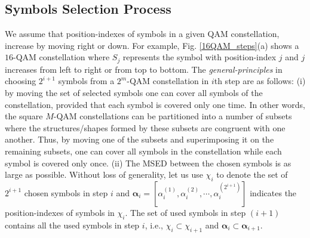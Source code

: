\documentclass[12pt, draftclsnofoot, onecolumn]{IEEEtran}
\newcommand{\mb}[1]{\boldsymbol{#1}}
\begin{document}
\subsection{Symbols Selection Process}
 We assume that position-indexes of symbols in a given QAM constellation,  increase by moving right or down.  For example, Fig. \ref{16QAM_steps}(a) shows   a $16$-QAM constellation   where $S_{j}$ represents the symbol with position-index $j$ and $j$ increases from left to right or  from top to bottom. 
  The \emph{general-principles} in choosing $2^{i+1}$ symbols from a $2^{m}$-QAM constellation in  $i$th step are as follows: (i) by moving the set  of  selected symbols one can  cover all symbols of the constellation, provided that each symbol is covered only one time.  In other words, the  square $M$-QAM constellations can be partitioned into a number of  subsets where the structures/shapes formed by these subsets are congruent with one another. Thus, by moving one of the subsets and superimposing it on the remaining subsets, one can cover all symbols in the constellation while each symbol is covered only once. \color{black} (ii) The MSED between the chosen symbols is as large as possible.  Without loss of   generality, let us use ${\chi}_{i}$ to  denote the set of  $2^{i+1}$ chosen symbols in step $i$ and ${\mb \alpha}_{i}=[\alpha^{(1)}_{i}, \alpha^{(2)}_{i}, \cdots, \alpha^{(2^{i+1})}_{i}]$  indicates the position-indexes of symbols in ${\chi}_{i}$.  The set of used symbols in step $(i+1)$ contains all the used symbols in step $i$, i.e., ${\chi}_{i} \subset {\chi}_{i+1}$ and ${\mb \alpha}_{i} \subset {\mb \alpha}_{i+1}$. 
\end{document}
